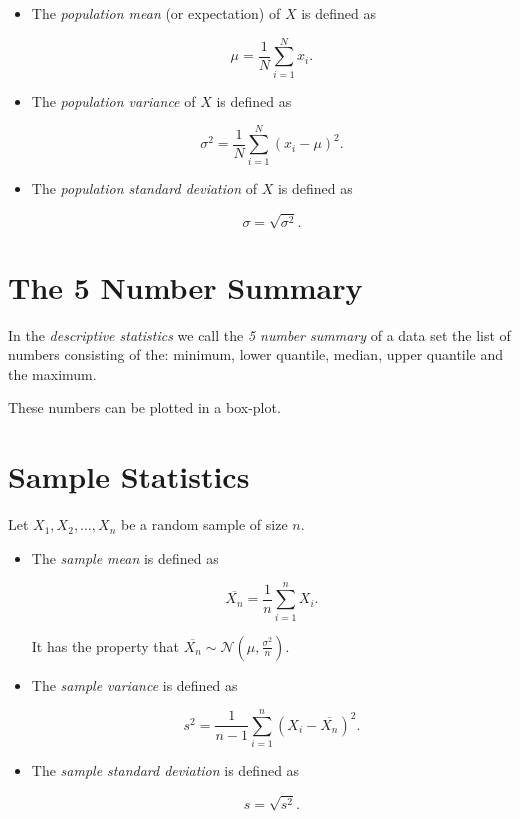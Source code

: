 \begin{itemize}

    \item The \emph{population mean} (or expectation) of \(X\) is defined as 

    \[
        \mu = \frac{1}{N} \sum_{i = 1}^{N} x_i.
    \]

    \item The \emph{population variance} of \(X\) is defined as 

    \[
        \sigma^2 = \frac{1}{N} \sum_{i = 1}^{N} (x_i - \mu)^2.
    \]

    \item The \emph{population standard deviation} of \(X\) is defined as 

    \[
        \sigma = \sqrt{\sigma^2}.
    \]

\end{itemize}

\section{The 5 Number Summary}

In the \emph{descriptive statistics} we call the \emph{5 number summary} of a data set the 
list of numbers consisting of the: minimum, lower quantile, median, upper quantile and the maximum.

These numbers can be plotted in a box-plot.

\section{Sample Statistics}

Let \(X_1, X_2, \dots, X_n\) be a random sample of size \(n\).

\begin{itemize}

    \item The \emph{sample mean} is defined as 

    \[
        \overline{X_n} = \frac{1}{n} \sum_{i = 1}^{n} X_i.
    \]
    
    It has the property that \(\overline{X_n} \sim \mathcal{N}(\mu, \frac{\sigma^2}{n})\).

    \item The \emph{sample variance} is defined as 

    \[
        s^2 = \frac{1}{n - 1} \sum_{i = 1}^{n}(X_i - \overline{X_n})^2.
    \]

    \item The \emph{sample standard deviation} is defined as 

    \[
        s = \sqrt{s^2}.
    \]

\end{itemize}

